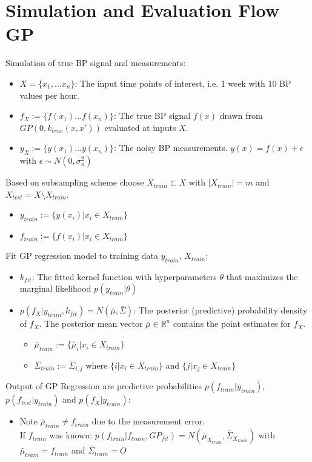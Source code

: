 \section{Simulation and Evaluation Flow GP}

Simulation of true BP signal and measurements:
    \begin{itemize}
        \item $X=\{x_1, \dots x_n\}$: The input time points of interest, i.e. 1 week with 10 BP values per hour.
        \item $f_X := \{f(x_1) \dots f(x_n)\}$: The true BP signal $f(x)$ drawn from $GP(0, k_{true}(x,x'))$ evaluated at inputs $X$.
        \item $y_X := \{y(x_1) \dots y(x_n)\}$: The noisy BP measurements. $y(x)= f(x) + \epsilon$ with $\epsilon \sim N(0, \sigma_n^2)$
    \end{itemize}

Based on subsampling scheme choose $X_{train} \subset X$ with $|X_{train}| = m$ and $X_{test} = X \setminus X_{train}$.
\begin{itemize}
    \item $y_{train} := \{y(x_i) | x_i \in X_{train}\}$
    \item  $f_{train} := \{f(x_i) | x_i \in X_{train}\}$
\end{itemize}


	Fit GP regression model to training data $y_{train}$, $X_{train}$:
    \begin{itemize}
        \item $k_{fit}$: The fitted kernel function with hyperparameters $\theta$ that maximizes the marginal likelihood
        $p(y_{train}| \theta)$
        \item $p(f_X| y_{train}, k_{fit}) = N(\bar{\mu}, \bar{\Sigma})$:
        The posterior (predictive) probability density of $f_X$. The posterior mean vector
        $\bar{\mu} \in \mathbb{R}^n$ contains the point estimates for $f_X$.
        \begin{itemize}
            \item $\bar{\mu}_{train} := \{\bar{\mu}_i | x_i \in X_{train}\}$
            \item $\bar{\Sigma}_{train} := \bar{\Sigma}_{i,j}$ where $\{i | x_i \in X_{train}\}$ and $\{j | x_j \in X_{train}\}$

        \end{itemize}
    \end{itemize}

	Output of GP Regression are predictive probabilities $p(f_{train}| y_{train})$,
		$p(f_{test}| y_{train})$ and $p(f_{X}| y_{train})$:
			\begin{itemize}
				\item Note $\bar{\mu}_{train} \neq f_{train}$ due to the measurement error. \\ If
				$f_{train}$ was known: $p(f_{train}| f_{train}, GP_{fit}) = N(\bar{\mu}_{X_{train}},
				\bar{\Sigma}_{X_{train}})$
				with $\bar{\mu}_{train} = f_{train}$ and $\bar{\Sigma}_{train} = {\displaystyle O}$
			\end{itemize}




